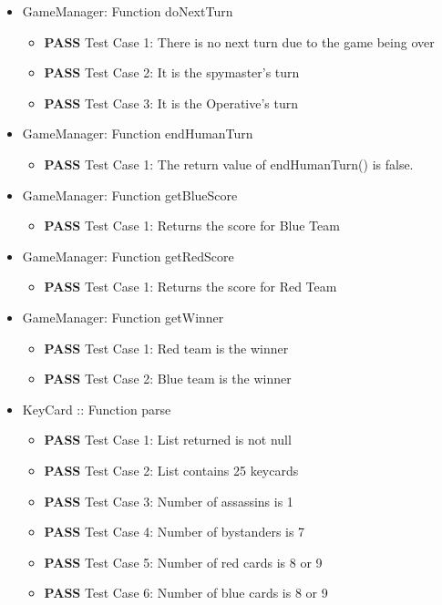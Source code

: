 \documentclass[12pt]{article}
\begin{document}
\begin{itemize}
\item GameManager: Function doNextTurn

    \begin{itemize}
        \item \textbf{PASS} Test Case 1: There is no next turn due to the game being over
        \item \textbf{PASS} Test Case 2: It is the spymaster's turn
        \item \textbf{PASS} Test Case 3: It is the Operative's turn
    \end{itemize}

\item GameManager: Function endHumanTurn

    \begin{itemize}
        \item \textbf{PASS} Test Case 1: The return value of endHumanTurn() is false.
    \end{itemize}

\item GameManager: Function getBlueScore

    \begin{itemize}
        \item \textbf{PASS} Test Case 1: Returns the score for Blue Team
    \end{itemize}

\item GameManager: Function getRedScore

    \begin{itemize}
        \item \textbf{PASS} Test Case 1: Returns the score for Red Team
    \end{itemize}

\item GameManager: Function getWinner

    \begin{itemize}
        \item \textbf{PASS} Test Case 1: Red team is the winner
        \item \textbf{PASS} Test Case 2: Blue team is the winner
    \end{itemize}

\item KeyCard :: Function parse

    \begin{itemize}
        \item \textbf{PASS} Test Case 1: List returned is not null
        \item \textbf{PASS} Test Case 2: List contains 25 keycards
        \item \textbf{PASS} Test Case 3: Number of assassins is 1
        \item \textbf{PASS} Test Case 4: Number of bystanders is 7
        \item \textbf{PASS} Test Case 5: Number of red cards is 8 or 9
        \item \textbf{PASS} Test Case 6: Number of blue cards is 8 or 9
    \end{itemize}


\end{itemize}
\end{document}
